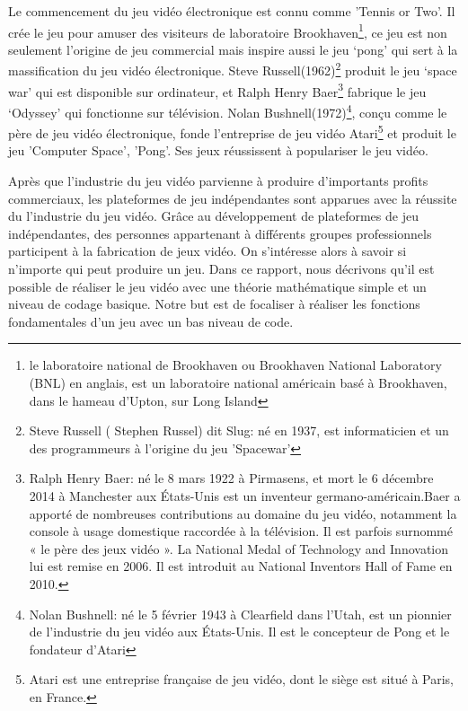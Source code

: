 \documentclass{article}
\begin{document}
Le commencement du jeu vidéo électronique est connu comme 'Tennis or Two'. Il crée le jeu pour amuser des visiteurs de laboratoire Brookhaven\footnote{le laboratoire national de Brookhaven ou Brookhaven National Laboratory (BNL) en anglais, est un laboratoire national américain basé à Brookhaven, dans le hameau d'Upton, sur Long Island}, ce jeu est non seulement l’origine de jeu commercial mais inspire aussi le jeu ‘pong’ qui sert à la massification du jeu vidéo électronique. Steve Russell(1962)\footnote{Steve Russell ( Stephen Russel) dit Slug: né en 1937, est informaticien et un des programmeurs à l'origine du jeu 'Spacewar'}  produit le jeu ‘space war’ qui est disponible sur ordinateur, et Ralph Henry Baer\footnote{Ralph Henry Baer: né le 8 mars 1922 à Pirmasens, et mort le 6 décembre 2014 à Manchester aux États-Unis est un inventeur germano-américain.Baer a apporté de nombreuses contributions au domaine du jeu vidéo, notamment la console à usage domestique raccordée à la télévision. Il est parfois surnommé « le père des jeux vidéo ». La National Medal of Technology and Innovation lui est remise en 2006. Il est introduit au National Inventors Hall of Fame en 2010.} fabrique le jeu ‘Odyssey’ qui fonctionne sur télévision. Nolan Bushnell(1972)\footnote{Nolan Bushnell: né le 5 février 1943 à Clearfield dans l'Utah, est un pionnier de l'industrie du jeu vidéo aux États-Unis. Il est le concepteur de Pong et le fondateur d'Atari}, conçu comme le père de jeu vidéo électronique, fonde l’entreprise de jeu vidéo Atari\footnote{Atari est une entreprise française de jeu vidéo, dont le siège est situé à Paris, en France.} et produit le jeu 'Computer Space', 'Pong'. Ses jeux réussissent à populariser le jeu vidéo.


Après que l’industrie du jeu vidéo parvienne à produire d’importants profits commerciaux, les plateformes de jeu indépendantes sont apparues avec la réussite du l’industrie du jeu vidéo. Grâce au développement de plateformes de jeu indépendantes, des personnes appartenant à différents groupes professionnels participent à la fabrication de jeux vidéo. On s'intéresse alors à savoir si n'importe qui peut produire un jeu. Dans ce rapport, nous décrivons qu’il est possible de réaliser le jeu vidéo avec une théorie mathématique simple et un niveau de codage basique. Notre but est de focaliser à réaliser les fonctions fondamentales d’un jeu avec un bas niveau de code.
\end{document}
